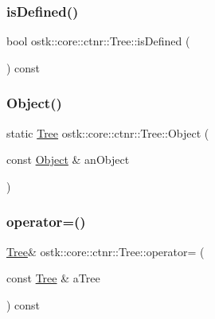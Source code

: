 \mbox{\label{classostk_1_1core_1_1ctnr_1_1_tree_ac8fbfabe34924004a96cd5ad154bbfcc}} 
\subsubsection{\texorpdfstring{is\+Defined()}{isDefined()}}
{\footnotesize\ttfamily bool ostk\+::core\+::ctnr\+::\+Tree\+::is\+Defined (\begin{DoxyParamCaption}{ }\end{DoxyParamCaption}) const}

\mbox{\label{classostk_1_1core_1_1ctnr_1_1_tree_a958ec32a53858072b339952c7a69d8b7}} 
\subsubsection{\texorpdfstring{Object()}{Object()}}
{\footnotesize\ttfamily static \hyperlink{classostk_1_1core_1_1ctnr_1_1_tree}{Tree} ostk\+::core\+::ctnr\+::\+Tree\+::\+Object (\begin{DoxyParamCaption}\item[{const \hyperlink{classostk_1_1core_1_1ctnr_1_1_object}{Object} \&}]{an\+Object }\end{DoxyParamCaption})\hspace{0.3cm}{\ttfamily [static]}}

\mbox{\label{classostk_1_1core_1_1ctnr_1_1_tree_a9ef0c73b6fa96d246ae34b2131365fa1}} 
\subsubsection{\texorpdfstring{operator=()}{operator=()}}
{\footnotesize\ttfamily \hyperlink{classostk_1_1core_1_1ctnr_1_1_tree}{Tree}\& ostk\+::core\+::ctnr\+::\+Tree\+::operator= (\begin{DoxyParamCaption}\item[{const \hyperlink{classostk_1_1core_1_1ctnr_1_1_tree}{Tree} \&}]{a\+Tree }\end{DoxyParamCaption}) const}



